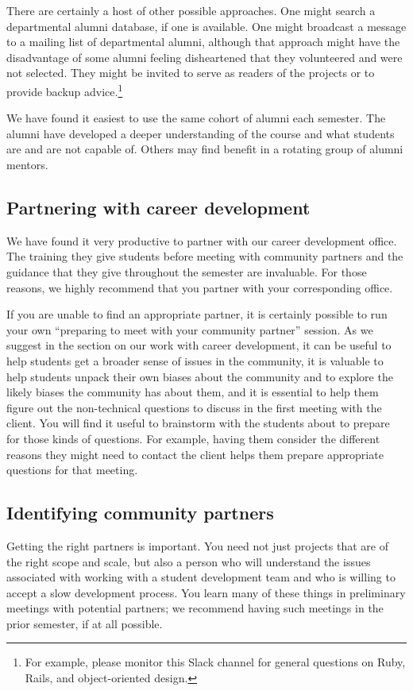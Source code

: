There are certainly a host of other possible approaches.  One might search
a departmental alumni database, if one is available.  One might broadcast
a message to a mailing list of departmental alumni, although that approach
might have the disadvantage of some alumni feeling disheartened that they
volunteered and were not selected.  They might be invited to serve as
readers of the projects or to provide backup advice.\footnote{For example,
please monitor this Slack channel for general questions on Ruby, Rails,
and object-oriented design.}

We have found it easiest to use the same cohort of alumni each semester.
The alumni have developed a deeper understanding of the course and what
students are and are not capable of.  Others may find benefit in a
rotating group of alumni mentors.

\subsection{Partnering with career development}

We have found it very productive to partner with our career development
office.  The training they give students before meeting with community
partners and the guidance that they give throughout the semester
are invaluable.  For those reasons, we highly recommend that you
partner with your corresponding office.

If you are unable to find an appropriate partner, it is certainly
possible to run your own ``preparing to meet with your community
partner'' session.  As we suggest in the section on our work with
career development, it can be useful to help students get a broader
sense of issues in the community, it is valuable to help students
unpack their own biases about the community and to explore the
likely biases the community has about them, and it is essential to
help them figure out the non-technical questions to discuss in the
first meeting with the client.  You will find it useful to brainstorm
with the students about to prepare for those kinds of questions.
For example, having them consider the different reasons they might
need to contact the client helps them prepare appropriate questions
for that meeting.

\subsection{Identifying community partners}

Getting the right partners is important.  You need not just projects that
are of the right scope and scale, but also a person who will understand
the issues associated with working with a student development team and
who is willing to accept a slow development process.  You learn many of
these things in preliminary meetings with potential partners; we recommend
having such meetings in the prior semester, if at all possible.

